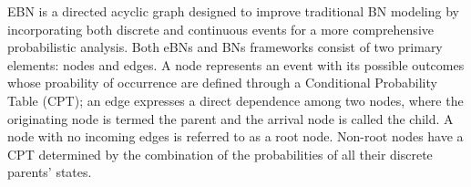 
EBN is a directed acyclic graph designed to improve traditional BN modeling by incorporating both discrete and continuous events for a more comprehensive probabilistic analysis.
Both eBNs and BNs frameworks consist of two primary elements: nodes and edges. A node represents an event with its possible outcomes whose proability of occurrence are defined through a Conditional Probability Table (CPT); an edge expresses a direct dependence among two nodes, where the originating node is termed the parent and the arrival node is called the child.
A node with no incoming edges is referred to as a root node. 
Non-root nodes have a CPT determined by the combination of the probabilities of all their discrete parents' states.\\

